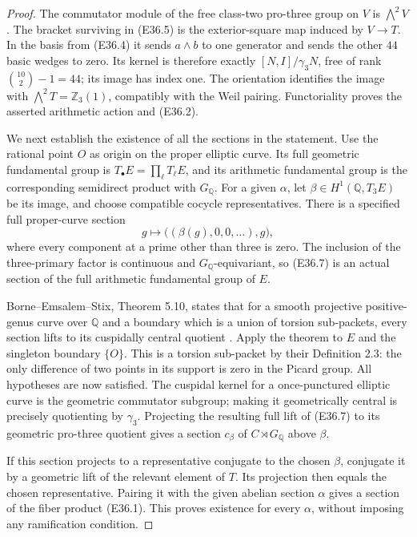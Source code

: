 \begin{proof}
The commutator module of the free class-two pro-three
group on $V$ is $\bigwedge^2V$. The bracket surviving in
(E36.5) is the exterior-square map induced by $V\to T$.
In the basis from (E36.4) it sends $a\wedge b$ to one
generator and sends the other $44$ basic wedges to zero.
Its kernel is therefore exactly $[N,I]/\gamma_3N$,
free of rank $\binom{10}{2}-1=44$; its image has index one.
The orientation identifies the image with
$\bigwedge^2T=\mathbb Z_3(1)$, compatibly with the Weil
pairing. Functoriality proves the asserted arithmetic
action and (E36.2).

We next establish the existence of all the sections in
the statement. Use the rational point $O$ as origin on
the proper elliptic curve. Its full geometric fundamental
group is
$T_\bullet E=\prod_\ell T_\ell E$, and its arithmetic
fundamental group is the corresponding semidirect product
with $G_{\mathbb Q}$. For a given $\alpha$, let
$\beta\in H^1(\mathbb Q,T_3E)$ be its image, and choose
compatible cocycle representatives. There is a specified
full proper-curve section
\[
 g\longmapsto\bigl((\beta(g),0,0,\ldots),g\bigr),
 \tag{E36.7}
\]
where every component at a prime other than three is zero.
The inclusion of the three-primary factor is continuous
and $G_{\mathbb Q}$-equivariant, so (E36.7) is an actual
section of the full arithmetic fundamental group of $E$.

Borne--Emsalem--Stix, Theorem 5.10, states that for a
smooth projective positive-genus curve over $\mathbb Q$
and a boundary which is a union of torsion sub-packets,
every section lifts to its cuspidally central quotient
\cite{E_BorneEmsalemStix}. Apply the theorem to $E$ and
the singleton boundary $\{O\}$. This is a torsion
sub-packet by their Definition 2.3: the only difference
of two points in its support is zero in the Picard group.
All hypotheses are now satisfied. The cuspidal kernel
for a once-punctured elliptic curve is the geometric
commutator subgroup; making it geometrically central
is precisely quotienting by $\gamma_3$. Projecting the
resulting full lift of (E36.7) to its geometric pro-three
quotient gives a section $c_\beta$ of $C\rtimes G_{\mathbb Q}$
above $\beta$.

If this section projects to a representative conjugate
to the chosen $\beta$, conjugate it by a geometric lift
of the relevant element of $T$. Its projection then
equals the chosen representative. Pairing it with the
given abelian section $\alpha$ gives a section of the
fiber product (E36.1). This proves existence for every
$\alpha$, without imposing any ramification condition.


\end{proof}
